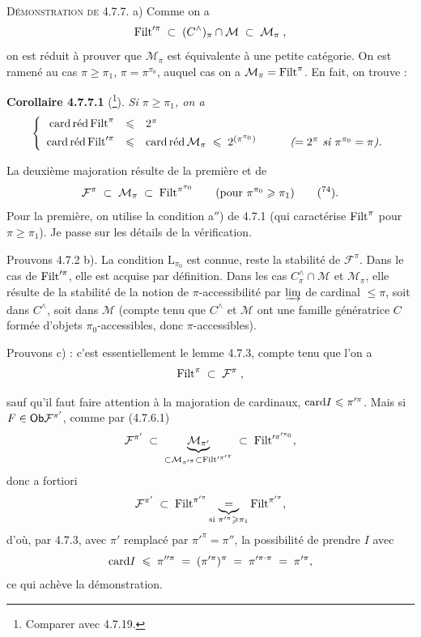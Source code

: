 \textsc{Démonstration de} 4.7.7. a) Comme on a
\[
\Filt'^{\pi} \;\subset\; (C^{\wedge})_{\pi} \cap \mathcal{M} \;\subset\; \mathcal{M}_{\pi} \;,
\]
on est réduit à prouver que $\mathcal{M}_{\pi}$ est équivalente à une petite catégorie. On est ramené au cas $\pi \geqslant \pi_1$, $\pi = \pi^{\pi_0}$, auquel cas on a $\mathcal{M}_{\pi} = \Filt^{\pi}$. En fait, on trouve :

\textbf{Corollaire 4.7.7.1} (\footnote[73]{Comparer avec 4.7.19.}). \textit{Si $\pi \geqslant \pi_1$, on a}
\[
\left\{
\begin{array}{rcll}
\cardred \Filt^{\pi} & \leqslant & 2^{\pi} & \\[4pt]
\cardred \Filt'^{\pi} & \leqslant & \cardred \mathcal{M}_{\pi} \;\leqslant\; 2^{(\pi^{\pi_0})} & \qquad \textit{($= 2^{\pi}$ si $\pi^{\pi_0} = \pi$).}
\end{array}
\right.
\]

La deuxième majoration résulte de la première et de
\[
\mathcal{F}^{\pi} \;\subset\; \mathcal{M}_{\pi} \;\subset\; \Filt^{\pi^{\pi_0}} \qquad (\text{pour } \pi^{\pi_0} \geqslant \pi_1) \qquad \text{(\footnotemark[74]).}
\]
Pour la première, on utilise la condition a$''$) de 4.7.1 (qui caractérise $\Filt^{\pi}$ pour $\pi \geqslant \pi_1$). Je passe sur les détails de la vérification.

Prouvons 4.7.2 b). La condition $\mathrm{L}_{\pi_0}$ est connue, reste la stabilité de $\mathcal{F}^{\pi}$. Dans le cas de $\Filt'^{\pi}$, elle est acquise par définition. Dans les cas $C^{\wedge}_{\pi} \cap \mathcal{M}$ et $\mathcal{M}_{\pi}$, elle résulte de la stabilité de la notion de $\pi$-accessibilité par $\varinjlim$ de cardinal $\leqslant \pi$, soit dans $C^{\wedge}$, soit dans $\mathcal{M}$ (compte tenu que $C^{\wedge}$ et $\mathcal{M}$ ont une famille génératrice $C$ formée d’objets $\pi_0$-accessibles, donc $\pi$-accessibles).

Prouvons c) : c’est essentiellement le lemme 4.7.3, compte tenu que l’on a
\[
\Filt^{\pi} \;\subset\; \mathcal{F}^{\pi} \;,
\]

\noindent{}
sauf qu'il faut faire attention à la majoration de cardinaux, $\card I \leqslant \pi'^{\pi}$. Mais si $F \in \Ob\mathcal{F}^{\pi'}$, comme par (4.7.6.1)
\[
\mathcal{F}^{\pi'} \;\subset\; \underbrace{\mathcal{M}_{\pi'}}_{\subset\mathcal{M}_{\pi'^{\pi}}\subset\Filt'^{\pi'^{\pi}}} \;\subset\; \Filt'^{\pi'^{\pi_0}} ,
\]
donc a fortiori
\[
\mathcal{F}^{\pi'} \;\subset\; \Filt^{\pi'^{\pi}} \underbrace{\;=\;}_{\text{si } \pi'^{\pi}\geqslant\pi_1} \Filt^{\pi'^{\pi}} , %
\]
d'où, par 4.7.3, avec $\pi'$ remplacé par $\pi'^{\pi}=\pi''$, la possibilité de prendre $I$ avec
\[
\card I \;\leqslant\; \pi''^{\pi} \;=\; (\pi'^{\pi})^{\pi} \;=\; \pi'^{\pi\cdot\pi} \;=\; \pi'^{\pi} ,
\]
ce qui achève la démonstration.

